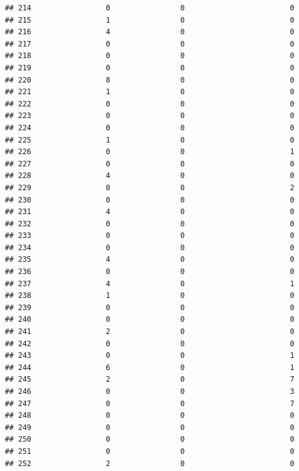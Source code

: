\documentclass[
]{article}
\begin{document}
\begin{verbatim}
## 214                 0                0                        0
## 215                 1                0                        0
## 216                 4                0                        0
## 217                 0                0                        0
## 218                 0                0                        0
## 219                 0                0                        0
## 220                 8                0                        0
## 221                 1                0                        0
## 222                 0                0                        0
## 223                 0                0                        0
## 224                 0                0                        0
## 225                 1                0                        0
## 226                 0                0                        1
## 227                 0                0                        0
## 228                 4                0                        0
## 229                 0                0                        2
## 230                 0                0                        0
## 231                 4                0                        0
## 232                 0                0                        0
## 233                 0                0                        0
## 234                 0                0                        0
## 235                 4                0                        0
## 236                 0                0                        0
## 237                 4                0                        1
## 238                 1                0                        0
## 239                 0                0                        0
## 240                 0                0                        0
## 241                 2                0                        0
## 242                 0                0                        0
## 243                 0                0                        1
## 244                 6                0                        1
## 245                 2                0                        7
## 246                 0                0                        3
## 247                 0                0                        7
## 248                 0                0                        0
## 249                 0                0                        0
## 250                 0                0                        0
## 251                 0                0                        0
## 252                 2                0                        0

\end{verbatim}
\end{document}
